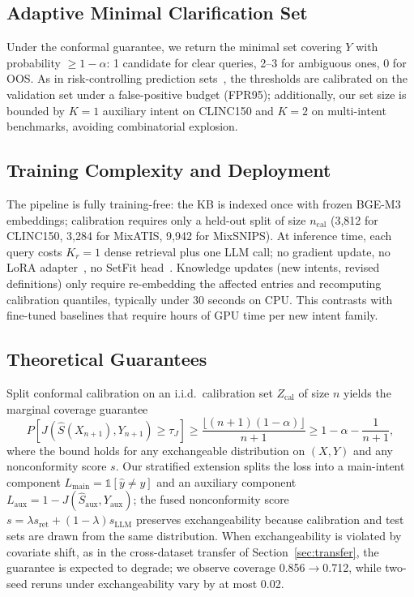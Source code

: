 \documentclass[sigconf, anonymous, review]{acmart}
\begin{document}
\subsection{Adaptive Minimal Clarification Set}
Under the conformal guarantee, we return the minimal set covering $Y$ with probability $\ge 1-\alpha$: 1 candidate for clear queries, 2--3 for ambiguous ones, 0 for OOS. As in risk-controlling prediction sets~\citep{rcps}, the thresholds are calibrated on the validation set under a false-positive budget (FPR95); additionally, our set size is bounded by $K=1$ auxiliary intent on CLINC150 and $K=2$ on multi-intent benchmarks, avoiding combinatorial explosion.

\subsection{Training Complexity and Deployment}
\label{sec:training}
The pipeline is fully training-free: the KB is indexed once with frozen BGE-M3 embeddings; calibration requires only a held-out split of size $n_{\text{cal}}$ (3,812 for CLINC150, 3,284 for MixATIS, 9,942 for MixSNIPS). At inference time, each query costs $K_r=1$ dense retrieval plus one LLM call; no gradient update, no LoRA adapter~\citep{dettmers2023qlora}, no SetFit head~\citep{ohashi2024setfit}. Knowledge updates (new intents, revised definitions) only require re-embedding the affected entries and recomputing calibration quantiles, typically under 30 seconds on CPU. This contrasts with fine-tuned baselines that require hours of GPU time per new intent family.

\subsection{Theoretical Guarantees}
Split conformal calibration on an i.i.d.\ calibration set $Z_{\text{cal}}$ of size $n$ yields the marginal coverage guarantee
\begin{equation}
P\!\left[J\!\left(\hat{S}(X_{n+1}),Y_{n+1}\right)\ge\tau_J\right]\ge \frac{\lfloor (n+1)(1-\alpha)\rfloor}{n+1}\ge 1-\alpha-\frac{1}{n+1},
\end{equation}
where the bound holds for any exchangeable distribution on $(X,Y)$ and any nonconformity score $s$. Our stratified extension splits the loss into a main-intent component $L_{\text{main}}=\mathbb{1}[\hat{y}\ne y]$ and an auxiliary component $L_{\text{aux}}=1-J(\hat{S}_{\text{aux}},Y_{\text{aux}})$; the fused nonconformity score $s=\lambda s_{\text{ret}}+(1-\lambda)s_{\text{LLM}}$ preserves exchangeability because calibration and test sets are drawn from the same distribution. When exchangeability is violated by covariate shift, as in the cross-dataset transfer of Section~\ref{sec:transfer}, the guarantee is expected to degrade; we observe coverage 0.856$\to$0.712, while two-seed reruns under exchangeability vary by at most 0.02.
\end{document}
